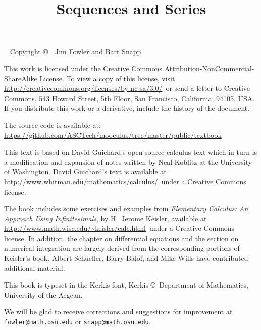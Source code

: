 \documentclass[justified]{tufte-book}
\title{Sequences and Series}
\begin{document}
\frontmatter

\maketitle

\pagebreak


\begin{fullwidth}
~\vfill
\thispagestyle{empty}
\setlength{\parindent}{0pt}
\setlength{\parskip}{\baselineskip}
Copyright \copyright\ \the\year\ Jim Fowler and Bart Snapp

This work is licensed under the Creative Commons
Attribution-NonCommercial-ShareAlike License. To view a copy of this
license, visit
\url{http://creativecommons.org/licenses/by-nc-sa/3.0/}~or send a
letter to Creative Commons, 543 Howard Street, 5th Floor, San
Francisco, California, 94105, USA. If you distribute this work or a
derivative, include the history of the document. 

The source code is available
at: \url{https://github.com/ASCTech/mooculus/tree/master/public/textbook}

\noindent
This text is based on David Guichard's open-source calculus text which
in turn is a modification and expansion of notes written by Neal
Koblitz at the University of Washington. David Guichard's text is
available at \url{http://www.whitman.edu/mathematics/calculus/}~under a Creative Commons license.

\noindent The book includes some exercises and examples from {\it
  Elementary Calculus: An Approach Using Infinitesimals}, by H.~Jerome
Keisler, available at
\url{http://www.math.wisc.edu/~keisler/calc.html}~under a Creative
Commons license. In addition, the chapter on differential equations
and the section on numerical integration are largely derived from the
corresponding portions of Keisler's book.  Albert Schueller, Barry
Balof, and Mike Wills have contributed additional material.

\noindent This book is typeset in the Kerkis font, 
Kerkis \copyright~Department of Mathematics, University of the Aegean.


\noindent We will be glad to receive corrections and suggestions for
improvement at \texttt{fowler@math.osu.edu} or
\texttt{snapp@math.osu.edu}.

\end{fullwidth}

\tableofcontents


\end{document}
